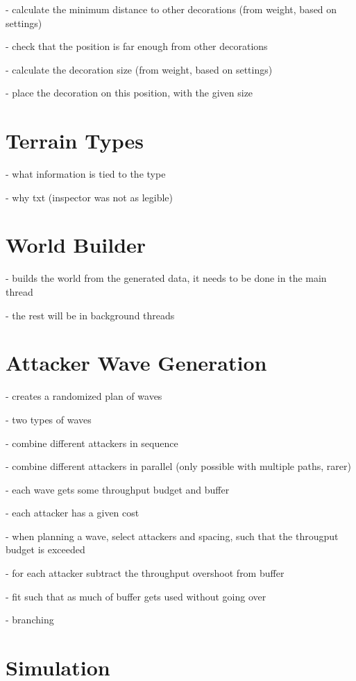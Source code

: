 - calculate the minimum distance to other decorations (from weight, based on settings)

- check that the position is far enough from other decorations

- calculate the decoration size (from weight, based on settings)

- place the decoration on this position, with the given size

\section{Terrain Types}

- what information is tied to the type

- why txt (inspector was not as legible)

\section{World Builder}

- builds the world from the generated data, it needs to be done in the main thread

- the rest will be in background threads

\section{Attacker Wave Generation}

- creates a randomized plan of waves

- two types of waves

- combine different attackers in sequence

- combine different attackers in parallel (only possible with multiple paths, rarer)

- each wave gets some throughput budget and buffer

- each attacker has a given cost

- when planning a wave, select attackers and spacing, such that the througput budget is exceeded

- for each attacker subtract the throughput overshoot from buffer

- fit such that as much of buffer gets used without going over

- branching

\section{Simulation}

